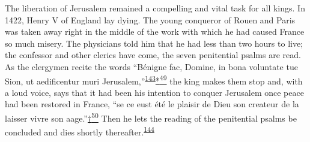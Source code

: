 The liberation of Jerusalem remained a compelling and vital task for all
kings. In 1422, Henry V of England lay dying. The young conqueror of
Rouen and Paris was taken away right in the middle of the work with
which he had caused France so much misery. The physicians told him that
he had less than two hours to live; the confessor and other clerics have
come, the seven penitential psalms are read. As the clergymen recite the
words ``Bénigne fac, Domine, in bona voluntate tue Sion, ut aedificentur
muri
Jerusalem,''\textsuperscript{\protect\hypertarget{10_Chapter_Three__THE_HEROIC_DREAM.xhtmlux5cux23id_1649}{\protect\hyperlink{23_NOTES.xhtmlux5cux23id_1650}{143}}}\protect\hypertarget{10_Chapter_Three__THE_HEROIC_DREAM.xhtmlux5cux23id_2885}{\protect\hyperlink{23_NOTES.xhtmlux5cux23id_2886}{*\textsuperscript{49}}}
the king makes them stop and, with a loud voice, says that it had been
his intention to conquer Jerusalem once peace had been restored in
France, ``se ce eust été le plaisir de Dieu son createur de la laisser
vivre son
aage.''\protect\hypertarget{10_Chapter_Three__THE_HEROIC_DREAM.xhtmlux5cux23id_2887}{\protect\hyperlink{23_NOTES.xhtmlux5cux23id_2888}{†\textsuperscript{50}}}
Then he lets the reading of the penitential psalms be concluded and dies
shortly
thereafter.\textsuperscript{\protect\hypertarget{10_Chapter_Three__THE_HEROIC_DREAM.xhtmlux5cux23id_1647}{\protect\hyperlink{23_NOTES.xhtmlux5cux23id_1648}{144}}}

